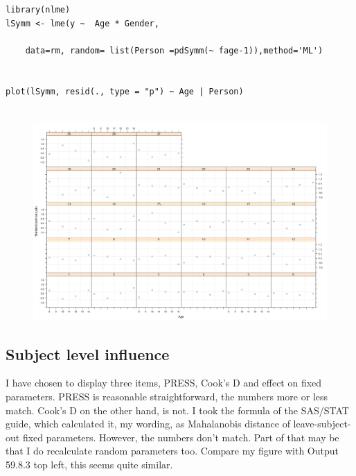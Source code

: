 \documentclass[a4paper,12pt]{article}
\begin{document}
\begin{framed}
\begin{verbatim}
library(nlme)
lSymm <- lme(y ~  Age * Gender,

    data=rm, random= list(Person =pdSymm(~ fage-1)),method='ML')


plot(lSymm, resid(., type = "p") ~ Age | Person)


\end{verbatim}
\end{framed}
\begin{figure}[h!]
\centering
\includegraphics[width=0.99\linewidth]{images/RbloggersPlot1}
\end{figure}
\newpage
\subsection{Subject level influence}

I have chosen to display three items, PRESS, Cook's D and effect on fixed parameters. PRESS is reasonable straightforward, the numbers more or less match. Cook's D on the other hand, is not. I took the formula of the SAS/STAT guide, which calculated it, my wording, as Mahalanobis distance of leave-subject-out fixed parameters. However, the numbers don't match. Part of that may be that I do recalculate random parameters too. Compare my figure with Output 59.8.3 top left, this seems quite similar. 
\end{document}
